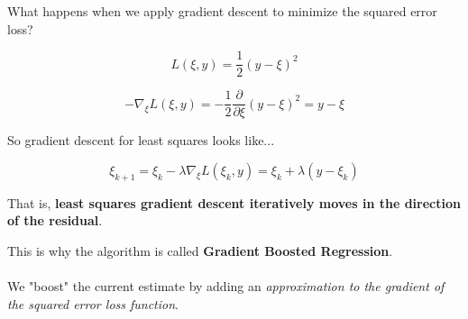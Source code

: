 \begin{frame}



\end{frame}
%

\begin{frame}
What happens when we apply gradient descent to minimize the squared error loss?

$$ L(\xi, y) = \frac{1}{2} \left( y - \xi \right)^2 $$
\end{frame}
%

\begin{frame}
$$ - \nabla_{\xi} L (\xi, y) = - \frac{1}{2} \frac{\partial}{\partial \xi} \left( y - \xi \right)^2 = y - \xi $$
\end{frame}
%

\begin{frame}
So gradient descent for least squares looks like...

$$\xi_{k+1} = \xi_{k} - \lambda \nabla_{\xi} L (\xi_k, y) = \xi_{k} + \lambda (y - \xi_{k})$$

That is, \textbf{least squares gradient descent iteratively moves in the direction of the residual}.
\end{frame}
%

\begin{frame}
This is why the algorithm is called \textbf{Gradient Boosted Regression}.\\~\\

We "boost" the current estimate by adding an \textit{approximation to the gradient of the squared error loss function}.
\end{frame}

